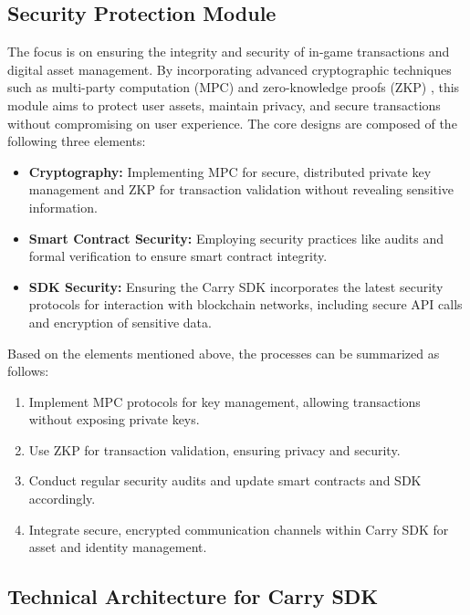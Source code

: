 \subsection{Security Protection Module}
The focus is on ensuring the integrity and security of in-game transactions and digital asset management. By incorporating advanced cryptographic techniques such as multi-party computation (MPC) \cite{feng2023efficient} and zero-knowledge proofs (ZKP) \cite{wang2023zero}, this module aims to protect user assets, maintain privacy, and secure transactions without compromising on user experience.  The core designs are composed of the following three elements:
\begin{itemize}
\item \textbf{Cryptography:} Implementing MPC for secure, distributed private key management and ZKP for transaction validation without revealing sensitive information.
\item \textbf{Smart Contract Security:} Employing security practices like audits and formal verification to ensure smart contract integrity.
\item \textbf{SDK Security:} Ensuring the Carry SDK incorporates the latest security protocols for interaction with blockchain networks, including secure API calls and encryption of sensitive data.
\end{itemize}
 Based on the elements mentioned above, the processes can be summarized as follows: 

\begin{enumerate}
    \item Implement MPC protocols for key management, allowing transactions without exposing private keys.
    \item Use ZKP for transaction validation, ensuring privacy and security.
    \item Conduct regular security audits and update smart contracts and SDK accordingly.
    \item Integrate secure, encrypted communication channels within Carry SDK for asset and identity management.
\end{enumerate}

\subsection{Technical Architecture for Carry SDK}

